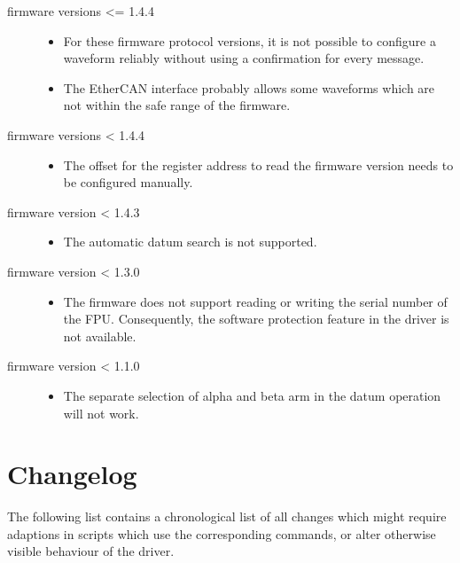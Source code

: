 \documentclass[11pt,a4paper]{scrartcl}
\begin{document}
\begin{description}
\item[firmware versions <= 1.4.4]
\begin{itemize}
\item For these firmware protocol versions, it is not possible to
  configure a waveform reliably without using a confirmation for every
  message.
\item The EtherCAN interface probably allows some waveforms which are not within
  the safe range of the firmware.
  \end{itemize}
\item[firmware versions < 1.4.4]
\begin{itemize}
\item The offset for the register address to read the firmware version needs
  to be configured manually.
\end{itemize}

\item[firmware version < 1.4.3]
  \begin{itemize}
  \item The automatic datum search is not supported.
  \end{itemize}

\item[firmware version < 1.3.0]
  \begin{itemize}
  \item The firmware does not support reading or writing the serial number of the FPU.
    Consequently, the software protection feature in the driver is not available.
  \end{itemize}

\item[firmware version < 1.1.0]
  \begin{itemize}
  \item The separate selection of alpha and beta arm in the datum operation will not work.
  \end{itemize}
  
\end{description}


\section{Changelog}
\label{sec:changelog}

The following list contains a chronological list of all changes which
might require adaptions in scripts which use the corresponding
commands, or alter otherwise visible behaviour of the driver.
\end{document}
